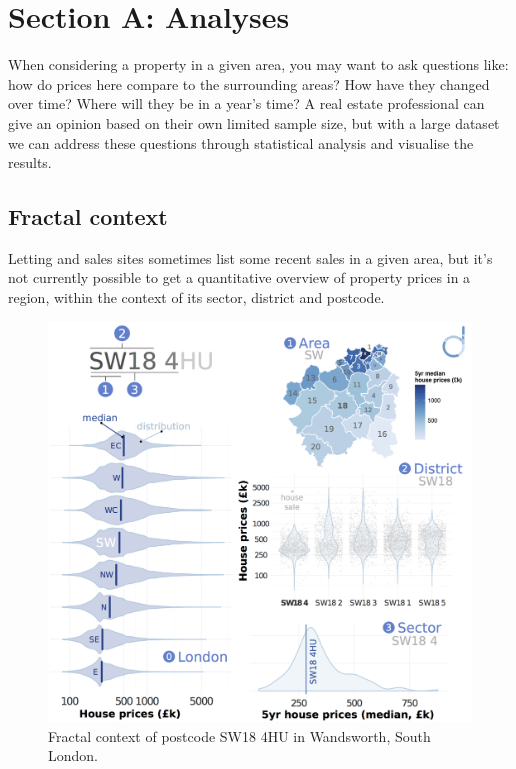 \documentclass[
10pt, %
a4paper, %
oneside, %
headinclude,footinclude, %
BCOR5mm, %
]{scrartcl}
\begin{document}



\vspace{-1em}
\section*{Section A: Analyses}

When considering a property in a given area, you may want to ask
questions like: how do prices here compare to the surrounding areas?
How have they changed over time? Where will they be in a year's time?
A real estate professional can give an opinion based on their own
limited sample size, but with a large dataset we can address these
questions through statistical analysis and visualise the results.

\vspace{-.5em}
\subsection*{Fractal context}

Letting and sales sites sometimes list some recent sales in a given
area, but it's not currently possible to get a quantitative overview
of property prices in a region, within the context of its sector,
district and postcode.

\begin{figure}
\centering
\includegraphics[width=.43\textwidth]{Figures/fractal.png}
\caption{ Fractal context of postcode SW18 4HU in Wandsworth, South London.}
\end{figure}
\end{document}
